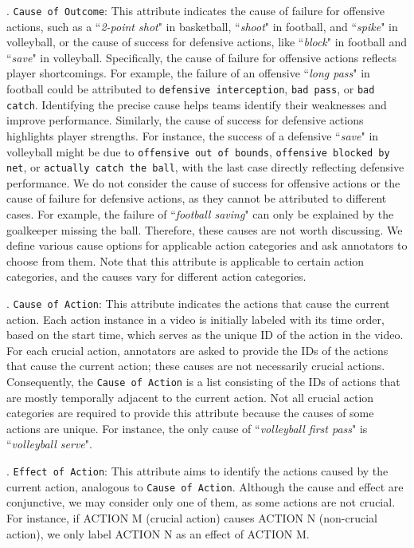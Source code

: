 {. \texttt{Cause of Outcome}: 
This attribute indicates the cause of failure for offensive actions, such as a ``\textit{2-point shot}" in basketball, ``\textit{shoot}" in football, and ``\textit{spike}" in volleyball, or the cause of success for defensive actions, like ``\textit{block}" in football and ``\textit{save}" in volleyball. Specifically, the cause of failure for offensive actions reflects player shortcomings. For example, the failure of an offensive ``\textit{long pass}" in football could be attributed to \texttt{defensive interception}, \texttt{bad pass}, or \texttt{bad catch}. Identifying the precise cause helps teams identify their weaknesses and improve performance. Similarly, the cause of success for defensive actions highlights player strengths. For instance, the success of a defensive ``\textit{save}" in volleyball might be due to \texttt{offensive out of bounds}, \texttt{offensive blocked by net}, or \texttt{actually catch the ball}, with the last case directly reflecting defensive performance. We do not consider the cause of success for offensive actions or the cause of failure for defensive actions, as they cannot be attributed to different cases. For example, the failure of ``\textit{football saving}" can only be explained by the goalkeeper missing the ball. Therefore, these causes are not worth discussing. We define various cause options for applicable action categories and ask annotators to choose from them. Note that this attribute is applicable to certain action categories, and the causes vary for different action categories.

. \texttt{Cause of Action}: This attribute indicates the actions that cause the current action. Each action instance in a video is initially labeled with its time order, based on the start time, which serves as the unique ID of the action in the video. For each crucial action, annotators are asked to provide the IDs of the actions that cause the current action; these causes are not necessarily crucial actions. Consequently, the \texttt{Cause of Action} is a list consisting of the IDs of actions that are mostly temporally adjacent to the current action. Not all crucial action categories are required to provide this attribute because the causes of some actions are unique. For instance, the only cause of ``\textit{volleyball first pass}" is ``\textit{volleyball serve}".

. \texttt{Effect of Action}: This attribute aims to identify the actions caused by the current action, analogous to \texttt{Cause of Action}. Although the cause and effect are conjunctive, we may consider only one of them, as some actions are not crucial. For instance, if ACTION M (crucial action) causes ACTION N (non-crucial action), we only label ACTION N as an effect of ACTION M.


}
